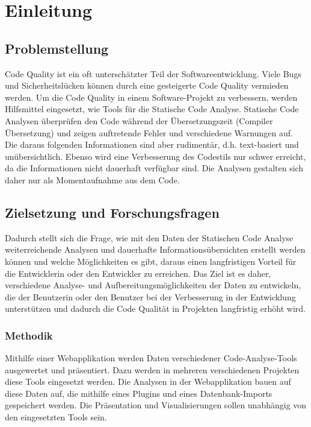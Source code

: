 \chapter{Einleitung}

\section{Problemstellung}
Code Quality ist ein oft unterschätzter Teil der Softwareentwicklung. Viele Bugs und Sicherheitslücken können durch eine gesteigerte Code Quality vermieden werden. Um die Code Quality in einem Software-Projekt zu verbessern, werden Hilfsmittel eingesetzt, wie Tools für die Statische Code Analyse. Statische Code Analysen überprüfen den Code während der Übersetzungszeit (Compiler Übersetzung) und zeigen auftretende Fehler und verschiedene Warnungen auf. Die daraus folgenden Informationen sind aber rudimentär, d.h. text-basiert und unübersichtlich. Ebenso wird eine Verbesserung des Codestils nur schwer erreicht, da die Informationen nicht dauerhaft verfügbar sind. Die Analysen gestalten sich daher nur als Momentaufnahme aus dem Code. 

\section{Zielsetzung und Forschungsfragen}

Dadurch stellt sich die Frage, wie mit den Daten der Statischen Code Analyse weiterreichende Analysen und dauerhafte Informationsübersichten erstellt werden können und welche Möglichkeiten es gibt, daraus einen langfristigen Vorteil für die Entwicklerin oder den Entwickler zu erreichen. Das Ziel ist es daher, verschiedene Analyse- und Aufbereitungsmöglichkeiten der Daten zu entwickeln, die der Benutzerin oder den Benutzer bei der Verbesserung in der Entwicklung unterstützen und dadurch die Code Qualität in Projekten langfristig erhöht wird.

\subsection{Methodik} 

Mithilfe einer Webapplikation werden Daten verschiedener Code-Analyse-Tools ausgewertet und präsentiert. Dazu werden in mehreren verschiedenen Projekten diese Tools eingesetzt werden. Die Analysen in der Webapplikation bauen auf diese Daten auf, die mithilfe eines Plugins und eines Datenbank-Imports gespeichert werden. Die Präsentation und Visualisierungen sollen unabhängig von den eingesetzten Tools sein.

